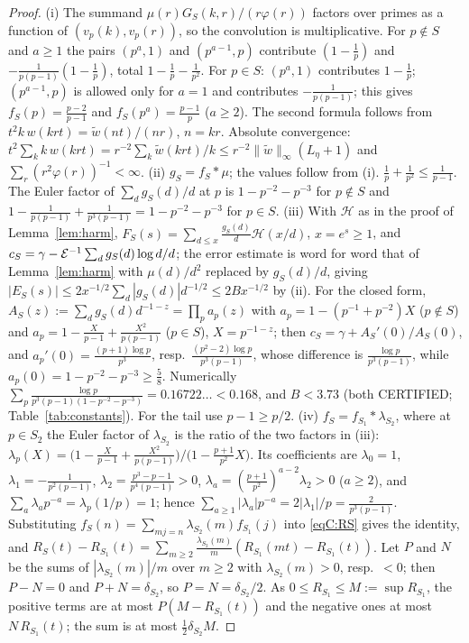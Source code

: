 \begin{proof}
(i) The summand $\mu(r)G_S(k,r)/(r\varphi(r))$ factors over primes as a function of $(v_p(k),v_p(r))$, so the convolution is
multiplicative. For $p\notin S$ and $a\ge1$ the pairs $(p^a,1)$ and $(p^{a-1},p)$ contribute $(1-\frac1p)$ and
$-\frac1{p(p-1)}(1-\frac1p)$, total $1-\frac1p-\frac1{p^2}$. For $p\in S$: $(p^a,1)$ contributes $1-\frac1p$; $(p^{a-1},p)$ is allowed only
for $a=1$ and contributes $-\frac1{p(p-1)}$; this gives $f_S(p)=\frac{p-2}{p-1}$ and $f_S(p^a)=\frac{p-1}p$ ($a\ge2$). The second
formula follows from $t^2k\,w(krt)=\widetilde w(nt)/(nr)$, $n=kr$. Absolute convergence:
$t^2\sum_kk\,w(krt)=r^{-2}\sum_k\widetilde w(krt)/k\le r^{-2}\|\widetilde w\|_\infty(L_\eta+1)$ and $\sum_r(r^2\varphi(r))^{-1}<\infty$.
(ii) $g_S=f_S*\mu$; the values follow from (i). $\frac1p+\frac1{p^2}\le\frac1{p-1}$. The Euler factor of $\sum_dg_S(d)/d$ at $p$ is
$1-p^{-2}-p^{-3}$ for $p\notin S$ and $1-\frac1{p(p-1)}+\frac1{p^3(p-1)}=1-p^{-2}-p^{-3}$ for $p\in S$.
(iii) With $\mathcal H$ as in the proof of Lemma~\ref{lem:harm}, $F_S(s)=\sum_{d\le x}\frac{g_S(d)}d\mathcal H(x/d)$, $x=e^s\ge1$,
and $c_S=\gamma-\mathcal{E}^{-1}\sum_dg_S(d)\log d/d$; the error estimate is word for word that of Lemma~\ref{lem:harm} with
$\mu(d)/d^2$ replaced by $g_S(d)/d$, giving $|E_S(s)|\le2x^{-1/2}\sum_d|g_S(d)|d^{-1/2}\le2Bx^{-1/2}$ by (ii). For the closed form,
$A_S(z):=\sum_dg_S(d)d^{-1-z}=\prod_pa_p(z)$ with $a_p=1-(p^{-1}+p^{-2})X$ ($p\notin S$) and
$a_p=1-\frac X{p-1}+\frac{X^2}{p(p-1)}$ ($p\in S$), $X=p^{-1-z}$; then $c_S=\gamma+A_S'(0)/A_S(0)$, and
$a_p'(0)=\frac{(p+1)\log p}{p^3}$, resp.\ $\frac{(p^2-2)\log p}{p^3(p-1)}$, whose difference is $\frac{\log p}{p^3(p-1)}$, while
$a_p(0)=1-p^{-2}-p^{-3}\ge\frac58$. Numerically $\sum_p\frac{\log p}{p^3(p-1)(1-p^{-2}-p^{-3})}=0.16722\ldots<0.168$, and $B<3.73$ (both CERTIFIED; Table~\ref{tab:constants}). For the tail use
$p-1\ge p/2$.
(iv) $f_S=f_{S_1}*\lambda_{S_2}$, where at $p\in S_2$ the Euler factor of $\lambda_{S_2}$ is the ratio of the two factors in (iii):
$\lambda_p(X)=\big(1-\frac X{p-1}+\frac{X^2}{p(p-1)}\big)/\big(1-\frac{p+1}{p^2}X\big)$. Its coefficients are $\lambda_0=1$,
$\lambda_1=-\frac1{p^2(p-1)}$, $\lambda_2=\frac{p^3-p-1}{p^4(p-1)}>0$, $\lambda_a=(\frac{p+1}{p^2})^{a-2}\lambda_2>0$ ($a\ge2$), and
$\sum_a\lambda_ap^{-a}=\lambda_p(1/p)=1$; hence $\sum_{a\ge1}|\lambda_a|p^{-a}=2|\lambda_1|/p=\frac2{p^3(p-1)}$. Substituting
$f_S(n)=\sum_{mj=n}\lambda_{S_2}(m)f_{S_1}(j)$ into \eqref{eqC:RS} gives the identity, and
$R_S(t)-R_{S_1}(t)=\sum_{m\ge2}\frac{\lambda_{S_2}(m)}m(R_{S_1}(mt)-R_{S_1}(t))$. Let $P$ and $N$ be the sums of
$|\lambda_{S_2}(m)|/m$ over $m\ge2$ with $\lambda_{S_2}(m)>0$, resp.\ $<0$; then $P-N=0$ and $P+N=\delta_{S_2}$, so $P=N=\delta_{S_2}/2$.
As $0\le R_{S_1}\le M:=\sup R_{S_1}$, the positive terms are at most $P(M-R_{S_1}(t))$ and the negative ones at most
$N\,R_{S_1}(t)$; the sum is at most $\frac12\delta_{S_2}M$.
\end{proof}

